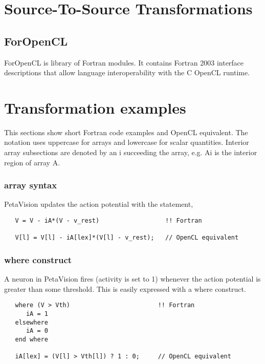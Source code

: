 \section{Source-To-Source Transformations}


\subsection{ForOpenCL}

ForOpenCL is library of Fortran modules.  It contains Fortran 2003 interface
descriptions that allow language interoperability with the C OpenCL runtime.

\section{Transformation examples}

This sections show short Fortran code examples and OpenCL equivalent.
The notation uses uppercase for arrays and lowercase for scalar quantities.
Interior array subsections are denoted by an i succeeding the array, e.g. Ai
is the interior region of array A.

\subsubsection{array syntax}

PetaVision updates the action potential with the statement,

\begin{verbatim}
   V = V - iA*(V - v_rest)                  !! Fortran

   V[l] = V[l] - iA[lex]*(V[l] - v_rest);   // OpenCL equivalent
\end{verbatim}

\subsubsection{where construct}

A neuron in PetaVision fires (activity is set to 1)
whenever the action potential is greater than some threshold.
This is easily expressed with a where construct.

\begin{verbatim}
   where (V > Vth)                        !! Fortran
      iA = 1
   elsewhere
      iA = 0
   end where

   iA[lex] = (V[l] > Vth[l]) ? 1 : 0;     // OpenCL equivalent
\end{verbatim}


